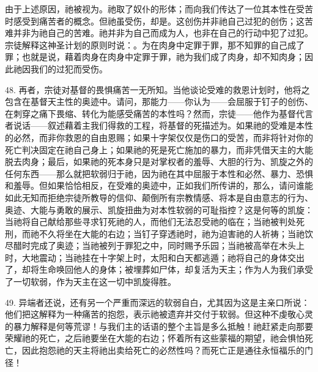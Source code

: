 由于上述原因，祂被视为。祂取了奴仆的形体；而向我们传达了一位其本性在受苦时感受到痛苦者的概念。但祂虽受伤，却是。这创伤并非祂自己过犯的创伤；这苦难并非为祂自己的苦难。祂并非为自己而成为人，也非在自己的行动中犯了过犯。宗徒解释这神圣计划的原则时说：。为在肉身中定罪于罪，那不知罪的自己成了罪；也就是说，藉着肉身在肉身中定罪于罪，祂为我们成了肉身，却不知肉身；因此祂因我们的过犯而受伤。\par

48. 再者，宗徒对基督的畏惧痛苦一无所知。当他谈论受难的救恩计划时，他将之包含在基督天主性的奥迹中。请问，那能力——你认为——会屈服于钉子的创伤、在刺穿之痛下畏缩、转化为能感受痛苦的本性吗？然而，宗徒——他作为基督代言者说话——叙述藉着主我们得救的工程，将基督的死描述为。如果祂的受难是本性的必然，而非你救恩的自由恩赐；如果十字架仅仅是伤口的受苦，而非将针对你的死亡判决固定在祂自己身上；如果祂的死是死亡施加的暴力，而非凭借天主的大能脱去肉身；最后，如果祂的死本身只是对掌权者的羞辱、大胆的行为、凯旋之外的任何东西——那么就把软弱归于祂，因为祂在其中屈服于本性和必然、暴力、恐惧和羞辱。但如果恰恰相反，在受难的奥迹中，正如我们所传讲的，那么，请问谁能如此无知而拒绝宗徒所教导的信仰、颠倒所有宗教情感、将本是自由意志的行为、奥迹、大能与勇敢的展示、凯旋扭曲为对本性软弱的可耻指控？这是何等的凯旋：当祂将自己献给那些寻求钉死祂的人，而他们无法忍受祂的临在；当祂被判处死刑，而祂不久将坐在大能的右边；当钉子穿透祂时，祂为迫害祂的人祈祷；当祂饮尽醋时完成了奥迹；当祂被列于罪犯之中，同时赐予乐园；当祂被高举在木头上时，大地震动；当祂挂在十字架上时，太阳和白天都逃遁；祂将自己的身体交出了，却将生命唤回他人的身体；被埋葬如尸体，却复活为天主；作为人为我们承受了一切软弱，作为天主在这一切中凯旋得胜。\par

49. 异端者还说，还有另一个严重而深远的软弱自白，尤其因为这是主亲口所说：他们把这解释为一种痛苦的抱怨，表示祂被遗弃并交付于软弱。但这种不虔敬心灵的暴力解释是何等荒谬！与我们主的话语的整个主旨是多么抵触！祂赶紧走向那要荣耀祂的死亡，之后祂要坐在大能的右边；怀着所有这些蒙福的期望，祂会惧怕死亡，因此抱怨祂的天主将祂出卖给死亡的必然性吗？而死亡正是通往永恒福乐的门径！\par

